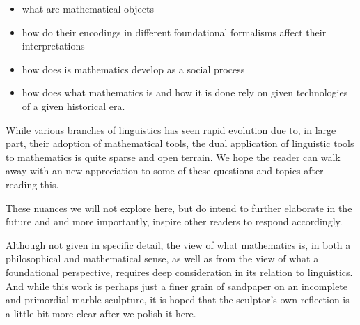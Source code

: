 \begin{itemize}

\item what are mathematical objects
\item   how do their encodings in different foundational formalisms affect their interpretations
\item how does is mathematics develop as a social process
\item how does what mathematics is and how it is done rely on given technologies of a given historical era.
  
\end{itemize}

While various branches of linguistics has seen rapid evolution due to, in large
part, their adoption of mathematical tools, the dual application of linguistic
tools to mathematics is quite sparse and open terrain. We hope the reader can
walk away with an new appreciation to some of these questions and topics after
reading this.

These nuances we will not explore here, but do intend to further elaborate in the
future and and more importantly, inspire other readers to respond accordingly.

Although not given in specific detail, the view of what mathematics is, in both
a philosophical and mathematical sense, as well as from the view of what a
foundational perspective, requires deep consideration in its relation to
linguistics. And while this work is perhaps just a finer grain of sandpaper on
an incomplete and primordial marble sculpture, it is hoped that the sculptor's
own reflection is a little bit more clear after we polish it here.
